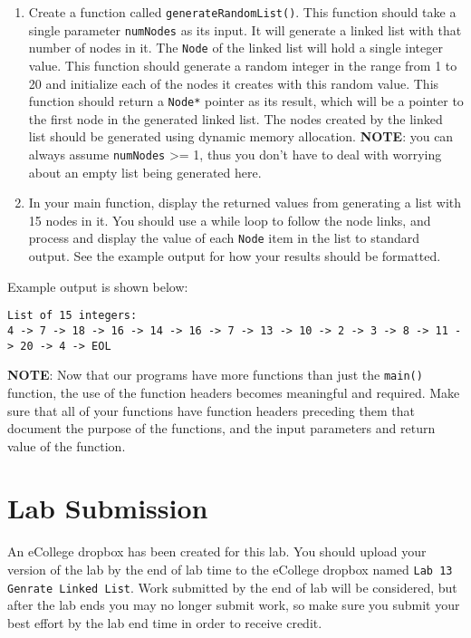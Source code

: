 \documentclass[11pt]{article}
\begin{document}
\begin{enumerate}
\item Create a function called \verb~generateRandomList()~.  This function
   should take a single parameter \verb~numNodes~ as its input.  It
   will generate a linked list with that number of nodes in it.  The
   \verb~Node~ of the linked list will hold a single integer value.  This
   function should generate a random integer in the range from 1 to
   20 and initialize each of the nodes it creates with this random
   value.  This function should return a \verb~Node*~ pointer as its
   result, which will be a pointer to the first node in the
   generated linked list.  The nodes created by the linked list should
   be generated using dynamic memory allocation.  \textbf{NOTE}: you can
   always assume \verb~numNodes~ >= 1, thus you don't have to deal
   with worrying about an empty list being generated here.
\item In your main function, display the returned values from generating
   a list with 15 nodes in it.  You should use a while loop to
   follow the node links, and process and display the value of each
   \verb~Node~ item in the list to standard output.  See the example 
   output for how your results should be formatted.
\end{enumerate}

Example output is shown below: 



\begin{verbatim}
List of 15 integers:
4 -> 7 -> 18 -> 16 -> 14 -> 16 -> 7 -> 13 -> 10 -> 2 -> 3 -> 8 -> 11 -> 20 -> 4 -> EOL
\end{verbatim}

\textbf{NOTE}: Now that our programs have more functions than just the
\verb~main()~ function, the use of the function headers becomes meaningful
and required.  Make sure that all of your functions have function
headers preceding them that document the purpose of the functions, and
the input parameters and return value of the function.
\section*{Lab Submission}
\label{sec-4}


An eCollege dropbox has been created for this lab.  You should upload
your version of the lab by the end of lab time to the eCollege dropbox
named \verb~Lab 13 Genrate Linked List~.  Work submitted by the end of
lab will be considered, but after the lab ends you may no longer
submit work, so make sure you submit your best effort by the lab end
time in order to receive credit.
\end{document}
